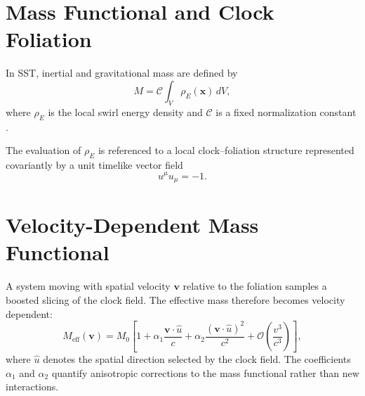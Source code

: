\documentclass[11pt]{article}
\begin{document}
    \section{Mass Functional and Clock Foliation}

        In SST, inertial and gravitational mass are defined by
        \begin{equation}
            M = \mathcal{C} \int_V \rho_{\!E}(\mathbf{x})\, dV ,
        \end{equation}
        where $\rho_{\!E}$ is the local swirl energy density and $\mathcal{C}$ is a fixed
        normalization constant \cite{SST59}.

        The evaluation of $\rho_{\!E}$ is referenced to a local clock--foliation structure
        represented covariantly by a unit timelike vector field
        \begin{equation}
            u^\mu u_\mu = -1 .
        \end{equation}

    \section{Velocity-Dependent Mass Functional}

        A system moving with spatial velocity $\mathbf{v}$ relative to the foliation samples
        a boosted slicing of the clock field.
        The effective mass therefore becomes velocity dependent:
        \begin{equation}
            M_{\mathrm{eff}}(\mathbf{v})
            =
            M_0
            \left[
                1
                + \alpha_1 \frac{\mathbf{v}\cdot\hat{u}}{c}
                + \alpha_2 \frac{(\mathbf{v}\cdot\hat{u})^2}{c^2}
                + \mathcal{O}\!\left(\frac{v^3}{c^3}\right)
            \right],
        \end{equation}
        where $\hat{u}$ denotes the spatial direction selected by the clock field.
        The coefficients $\alpha_1$ and $\alpha_2$ quantify anisotropic corrections to the
        mass functional rather than new interactions.
\end{document}
